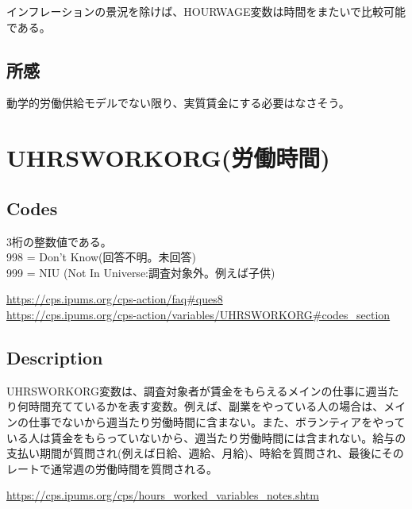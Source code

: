 \documentclass{jsarticle}
\begin{document}
インフレーションの景況を除けば、HOURWAGE変数は時間をまたいで比較可能である。

\subsection{所感}

動学的労働供給モデルでない限り、実質賃金にする必要はなさそう。

\section{UHRSWORKORG(労働時間)}

\subsection{Codes}

3桁の整数値である。\\
  
998 = Don’t Know(回答不明。未回答)\\
  
999 = NIU (Not In 
Universe:調査対象外。例えば子供)

\url{https://cps.ipums.org/cps-action/faq#ques8}\\
  
 
\url{https://cps.ipums.org/cps-action/variables/UHRSWORKORG#codes_section}

\subsection{Description}

UHRSWORKORG変数は、調査対象者が賃金をもらえるメインの仕事に週当たり何時間充てているかを表す変数。例えば、副業をやっている人の場合は、メインの仕事でないから週当たり労働時間に含まない。また、ボランティアをやっている人は賃金をもらっていないから、週当たり労働時間には含まれない。給与の支払い期間が質問され(例えば日給、週給、月給)、時給を質問され、最後にそのレートで通常週の労働時間を質問される。

\url{https://cps.ipums.org/cps/hours_worked_variables_notes.shtm}\\
  
\end{document}
